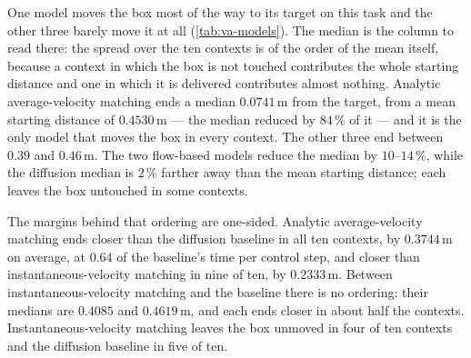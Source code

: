 One model moves the box most of the way to its target on this task and the other three barely move it at all
(\autoref{tab:va-models}). The median is the column to read there: the spread over the ten contexts is
of the order of the mean itself, because a context in which the box is not touched contributes the whole
starting distance and one in which it is delivered contributes almost nothing. Analytic average-velocity matching ends a median $0.0741$\,m from the target,
from a mean starting distance of $0.4530$\,m --- the median reduced by $84\,\%$ of it --- and it is the only model
that moves the box in every context. The other three end between $0.39$ and $0.46$\,m. The two
flow-based models reduce the median by $10$--$14\,\%$, while the diffusion median is $2\,\%$ farther
away than the mean starting distance; each leaves the box untouched in some contexts.

The margins behind that ordering are one-sided. Analytic average-velocity matching ends closer than the
diffusion baseline in all ten contexts, by $0.3744$\,m on average, at $0.64$ of the baseline's time per
control step, and closer than instantaneous-velocity matching in nine of ten, by $0.2333$\,m. Between
instantaneous-velocity matching and the baseline there is no ordering: their medians are $0.4085$ and
$0.4619$\,m, and each ends closer in about half the contexts. Instantaneous-velocity matching leaves the
box unmoved in four of ten contexts and the diffusion baseline in five of ten.

